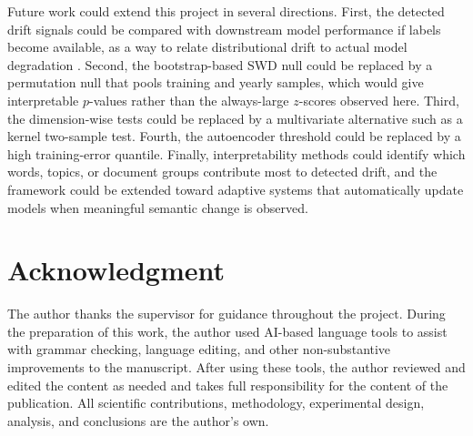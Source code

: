 \documentclass[conference]{IEEEtran}
\begin{document}
Future work could extend this project in several directions. First, the detected drift signals could be compared with downstream model performance if labels become available, as a way to relate distributional drift to actual model degradation \cite{bayram2022}. Second, the bootstrap-based SWD null could be replaced by a permutation null that pools training and yearly samples, which would give interpretable $p$-values rather than the always-large $z$-scores observed here. Third, the dimension-wise tests could be replaced by a multivariate alternative such as a kernel two-sample test. Fourth, the autoencoder threshold could be replaced by a high training-error quantile. Finally, interpretability methods could identify which words, topics, or document groups contribute most to detected drift, and the framework could be extended toward adaptive systems that automatically update models when meaningful semantic change is observed.

\section*{Acknowledgment}

The author thanks the supervisor for guidance throughout the project. During the preparation of this work, the author used AI-based language tools to assist with grammar checking, language editing, and other non-substantive improvements to the manuscript. After using these tools, the author reviewed and edited the content as needed and takes full responsibility for the content of the publication. All scientific contributions, methodology, experimental design, analysis, and conclusions are the author's own.
\end{document}
